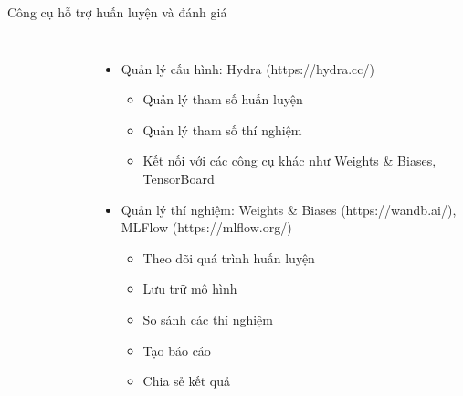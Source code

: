 \documentclass{beamer}
\begin{document}
\begin{frame}{Công cụ hỗ trợ huấn luyện và đánh giá}
    \begin{columns}
        \begin{figure}
            \centering
        \end{figure}
        \begin{itemize}
            \item Quản lý cấu hình: Hydra (https://hydra.cc/)
            \begin{itemize}
                \item Quản lý tham số huấn luyện
                \item Quản lý tham số thí nghiệm
                \item Kết nối với các công cụ khác như Weights \& Biases, TensorBoard
            \end{itemize}
            \item Quản lý thí nghiệm: Weights \& Biases (https://wandb.ai/), MLFlow (https://mlflow.org/)
            \begin{itemize}
                \item Theo dõi quá trình huấn luyện
                \item Lưu trữ mô hình
                \item So sánh các thí nghiệm
                \item Tạo báo cáo
                \item Chia sẻ kết quả
            \end{itemize}
        \end{itemize}
    \end{columns}
\end{frame}
\end{document}
